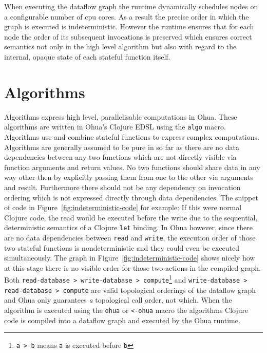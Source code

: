 When executing the dataflow graph the runtime dynamically schedules nodes on a configurable number of cpu cores.
As a result the precise order in which the graph is executed is indeterministic.
However the runtime ensures that for each node the order of its subsequent invocations is preserved which ensures correct semantics not only in the high level algorithm but also with regard to the internal, opaque state of each stateful function itself.

\section{Algorithms}

Algorithms express high level, parallelisable computations in Ohua.
These algorithms are written in Ohua's Clojure EDSL using the \texttt{algo} macro.
Algorithms use and combine stateful functions to express complex computations.
Algorithms are generally assumed to be pure in so far as there are no data dependencies between any two functions which are not directly visible via function arguments and return values.
No two functions should share data in any way other then by explicitly passing them from one to the other via arguments and result.
Furthermore there should not be any dependency on invocation ordering which is not expressed directly through data dependencies.
The snippet of code in Figure~\ref{fig:indeterministic-code} for example: If this were normal Clojure code, the read would be executed before the write due to the sequential, deterministic semantics of a Clojure \texttt{let} binding.
In Ohua however, since there are no data dependencies between \texttt{read} and \texttt{write}, the execution order of those two stateful functions is nondeterministic and they could even be executed simultaneously.
The graph in Figure~\ref{fig:indeterministic-code} shows nicely how at this stage there is no visible order for those two actions in the compiled graph.
Both \texttt{read-database > write-database > compute}\footnote{\texttt{a > b} means \texttt{a} is executed before \texttt{b}} and \texttt{write-database > read-database > compute} are valid topological orderings of the dataflow graph and Ohua only guarantees \emph{a} topological call order, not which.
When the algorithm is executed using the \texttt{ohua} or \texttt{<-ohua} macro the algorithms Clojure code is compiled into a dataflow graph and executed by the Ohua runtime.

